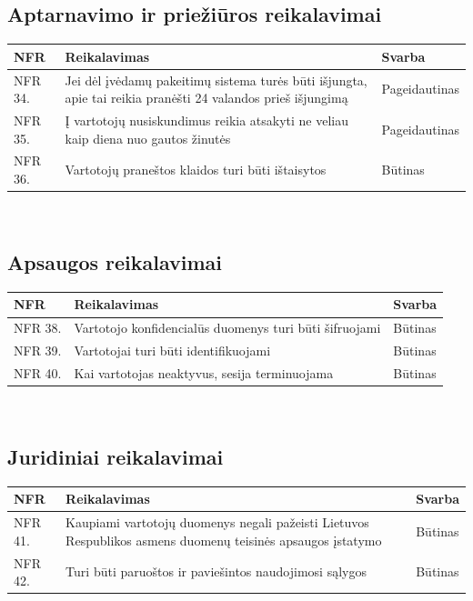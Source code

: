 \documentclass{VUMIFPSkursinis}
\begin{document}
\subsection{Aptarnavimo ir priežiūros reikalavimai}
	\noindent
    \begin{centering}
    	\begin{tabular}{ | p{} | p{} | p{} |}
    		\hline
   			NFR & Reikalavimas & Svarba       \\ \hline
		  	NFR 34. & Jei dėl įvėdamų pakeitimų sistema turės būti išjungta, apie tai reikia pranėšti 24 valandos prieš išjungimą & Pageidautinas \\ \hline
            NFR 35. & Į vartotojų nusiskundimus reikia atsakyti ne veliau kaip diena nuo gautos žinutės & Pageidautinas \\ \hline
            NFR 36. & Vartotojų praneštos klaidos turi būti ištaisytos & Būtinas \\ \hline
   		\end{tabular}\\
    \end{centering}

\subsection{Apsaugos reikalavimai}
	\noindent
    \begin{centering}
    	\begin{tabular}{ | p{} | p{} | p{} |}
    		\hline
   			NFR & Reikalavimas & Svarba       \\ \hline
		  	NFR 38. & Vartotojo konfidencialūs duomenys turi būti šifruojami & Būtinas \\ \hline
            NFR 39. & Vartotojai turi būti identifikuojami & Būtinas \\ \hline
            NFR 40. & Kai vartotojas neaktyvus, sesija terminuojama & Būtinas \\ \hline
   		\end{tabular}\\
    \end{centering}
    
\subsection{Juridiniai reikalavimai}
	\noindent
    \begin{centering}
    	\begin{tabular}{ | p{} | p{} | p{} |}
    		\hline
   			NFR & Reikalavimas & Svarba       \\ \hline
		  	NFR 41. & Kaupiami vartotojų duomenys negali pažeisti Lietuvos Respublikos asmens duomenų teisinės apsaugos įstatymo & Būtinas \\ \hline
            NFR 42. & Turi būti paruoštos ir paviešintos naudojimosi sąlygos & Būtinas \\ \hline
   		\end{tabular}\\
    \end{centering}
\end{document}
